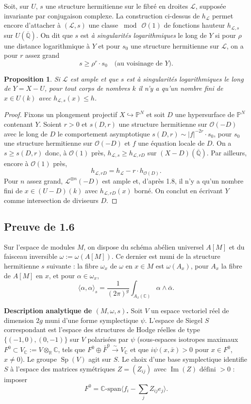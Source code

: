 \documentclass[12pt,a4paper]{article}
\theoremstyle{plain}
\newtheorem{proposition}[theorem]{Proposition}
\theoremstyle{definition}
\theoremstyle{remark}
\DeclareMathOperator{\Sp}{Sp}
\DeclareMathOperator{\Impartie}{Im}
\newcommand{\CC}{\mathbb{C}}
\newcommand{\QQ}{\mathbb{Q}}
\newcommand{\RR}{\mathbb{R}}
\newcommand{\cO}{\mathcal{O}}
\newcommand{\cL}{\mathcal{L}}
\providecommand{\CC}{\mathbb{C}}
\providecommand{\PP}{\mathbb{P}}
\providecommand{\QQ}{\mathbb{Q}}
\providecommand{\RR}{\mathbb{R}}
\providecommand{\cL}{\mathcal{L}}
\providecommand{\cO}{\mathcal{O}}
\begin{document}
Soit, sur $U$, $s$ une structure hermitienne sur le fibré en droites $\cL$, supposée invariante par conjugaison complexe. La construction ci-dessus de $h_{\cL}$ permet encore d'attacher à $(\cL, s)$ une classe $\bmod\ \cO(1)$ de fonctions hauteur $h_{\cL,s}$ sur $U(\overline{\QQ})$. On dit que $s$ est \emph{à singularités logarithmiques} le long de $Y$ si pour $\rho$ une distance logarithmique à $Y$ et pour $s_0$ une structure hermitienne sur $\cL$, on a pour $r$ assez grand
\[
s \geq \rho^r \cdot s_0 \quad \text{(au voisinage de $Y$)}.
\]

\begin{proposition}
Si $\cL$ est ample et que $s$ est à singularités logarithmiques le long de $Y = X - U$, pour tout corps de nombres $k$ il n'y a qu'un nombre fini de $x \in U(k)$ avec $h_{\cL,s}(x) \leq h$.
\end{proposition}

\begin{proof}
Fixons un plongement projectif $X \hookrightarrow \PP^N$ et soit $D$ une hypersurface de $\PP^N$ contenant $Y$. Soient $r > 0$ et $s(D,r)$ une structure hermitienne sur $\cO(-D)$ avec le long de $D$ le comportement asymptotique $s(D,r) \sim |f|^{-2r} \cdot s_0$, pour $s_0$ une structure hermitienne sur $\cO(-D)$ et $f$ une équation locale de $D$. On a $s \geq s(D,r)$ donc, à $\cO(1)$ près, $h_{\cL,s} \geq h_{\cL,rD}$ sur $(X-D)(\overline{\QQ})$. Par ailleurs, encore à $\cO(1)$ près,
\[
h_{\cL,rD} = h_{\cL} - r \cdot h_{\cO(D)}.
\]
Pour $n$ assez grand, $\cL^{\otimes n}(-D)$ est ample et, d'après 1.8, il n'y a qu'un nombre fini de $x \in (U-D)(k)$ avec $h_{\cL,rD}(x)$ borné. On conclut en écrivant $Y$ comme intersection de diviseurs $D$.
\end{proof}

\subsection{Preuve de 1.6}

Sur l'espace de modules $M$, on dispose du schéma abélien universel $A[M]$ et du faisceau inversible $\omega := \omega(A[M])$. Ce dernier est muni de la structure hermitienne $s$ suivante : la fibre $\omega_x$ de $\omega$ en $x \in M$ est $\omega(A_x)$, pour $A_x$ la fibre de $A[M]$ en $x$, et pour $\alpha \in \omega_x$,
\[
\langle \alpha, \alpha \rangle_s = \frac{1}{(2\pi)^g} \int_{A_x(\CC)} \alpha \wedge \bar{\alpha}.
\]

\textbf{Description analytique de $(M, \omega, s)$.} Soit $V$ un espace vectoriel réel de dimension $2g$ muni d'une forme symplectique $\psi$. L'espace de Siegel $S$ correspondant est l'espace des structures de Hodge réelles de type $\{(-1,0), (0,-1)\}$ sur $V$ polarisées par $\psi$ (sous-espaces isotropes maximaux $F^0 \subset V_\CC := V \otimes_\RR \CC$, tels que $F^0 \oplus \bar{F}^0 \xrightarrow{\sim} V_\CC$ et que $i\psi(x,\bar{x}) > 0$ pour $x \in F^0$, $x \neq 0$). Le groupe $\Sp(V)$ agit sur $S$. Le choix d'une base symplectique identifie $S$ à l'espace des matrices symétriques $Z = (Z_{ij})$ avec $\Impartie(Z) \text{ défini } > 0$ : imposer
\[
F^0 = \CC\text{-span}\langle f_i - \sum_j Z_{ij}e_j \rangle.
\]
\end{document}

